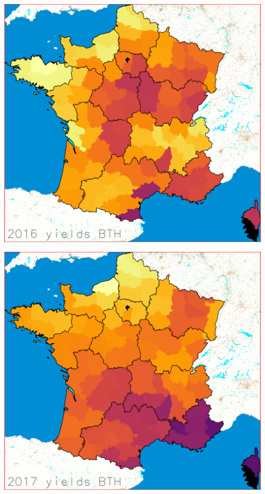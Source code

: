 \documentclass[landscape]{slides}
\begin{document}
\begin{slide} 
\includegraphics[width=\textwidth]{y2016}
\end{slide}
\begin{slide} 
\includegraphics[width=\textwidth]{y2017}
\end{slide}
\end{document}
